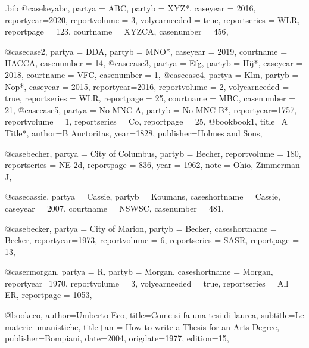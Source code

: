 \begin{filecontents*}[overwrite]{\jobname.bib}
@case{keyabc,
  partya = {ABC}, 
  partyb = {XYZ*},
  caseyear = {2016},
  reportyear={2020},
  reportvolume = {3},
  volyearneeded = {true},
  reportseries = {WLR},
  reportpage = {123},
  courtname = {XYZCA},
  casenumber = {456},
}

@case{case2,
  partya = {DDA}, 
  partyb = {MNO*},
  caseyear = {2019},
  courtname = {HACCA},
  casenumber = {14},
}
@case{case3,
  partya = {Efg}, 
  partyb = {Hij*},
  caseyear = {2018},
  courtname = {VFC},
  casenumber = {1},
}
@case{case4,
  partya = {Klm}, 
  partyb = {Nop*},
  caseyear = {2015},
  reportyear={2016},
  reportvolume = {2},
  volyearneeded = {true},
  reportseries = {WLR},
  reportpage = {25},
  courtname = {MBC},
  casenumber = {21},
}
@case{case5,
  partya = {No MNC A}, 
  partyb = {No MNC B*},
  reportyear={1757},
  reportvolume = {1},
  reportseries = {Co},
  reportpage = {25},
}
@book{book1,
title={A Title*},
author={B Auctoritas},
year={1828},
publisher={Holmes and Sons},
}



@case{becher,
  partya = {City of Columbus}, 
  partyb = {Becher},
  reportvolume = {180},
  reportseries = {NE 2d},
  reportpage = {836},
  year = {1962},
  note = {Ohio, Zimmerman J},
}


@case{cassie,
  partya = {Cassie}, 
  partyb = {Koumans},
  caseshortname = {Cassie},
  caseyear = {2007},
  courtname = {NSWSC},
  casenumber = {481},
}


@case{becker,
  partya = {City of Marion}, 
  partyb = {Becker},
  caseshortname = {Becker},
  reportyear={1973},
  reportvolume = {6},
  reportseries = {SASR},
  reportpage = {13},
}

@case{rmorgan,
  partya = {R}, 
  partyb = {Morgan},
  caseshortname = {Morgan},
  reportyear={1970},
  reportvolume = {3},
  volyearneeded = {true},
  reportseries = {All ER},
  reportpage = {1053},
}


@book{eco,
author={Umberto Eco},
title={Come si fa una tesi di laurea},
subtitle={Le materie umanistiche},
title+an = {How to write a Thesis for an Arts Degree},
publisher={Bompiani},
date={2004},
origdate={1977},
edition={15},
}


\end{filecontents*}
